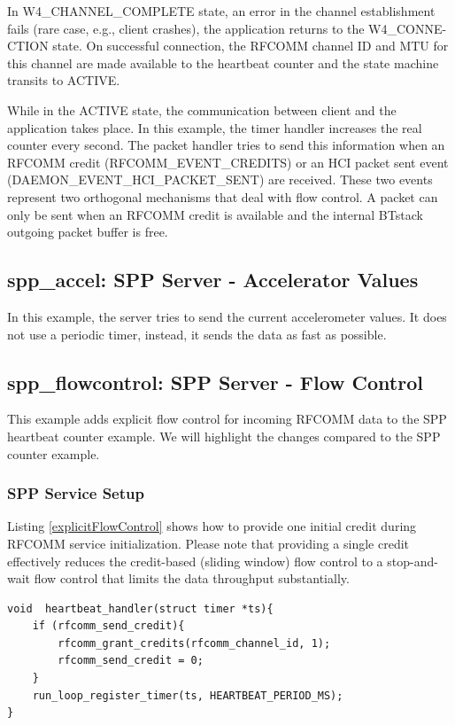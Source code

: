 \documentclass[a4paper,titlepage,oneside,12pt]{amsart} %
\begin{document}
In W4\_CHANNEL\_COMPLETE state, an error in the channel establishment fails (rare case, e.g., client crashes), the application returns to the W4\_CONNE-CTION state. On successful connection, the RFCOMM channel ID and MTU for this channel are made available to the heartbeat counter and the state machine transits to ACTIVE.

While in the ACTIVE state, the communication between client and the application takes place. In this example, the timer handler increases the real counter every second. The packet handler tries to send this information when an RFCOMM credit (RFCOMM\_EVENT\_CREDITS) or an HCI packet sent event (DAEMON\_EVENT\_HCI\_PACKET\_SENT) are received. These two events represent two orthogonal mechanisms that deal with flow control. A packet can only be sent when an RFCOMM credit is available and the internal BTstack outgoing packet buffer is free.


\subsection{spp\_accel: SPP Server - Accelerator Values}
In this example, the server tries to send the current accelerometer values. It does not use a periodic timer, instead, it sends the data as fast as possible. 


\subsection {spp\_flowcontrol: SPP Server - Flow Control}
\label{example:spp_flow_control}
This example adds explicit flow control for incoming RFCOMM data to the SPP heartbeat counter example. We will highlight the changes compared to the SPP counter example. 

\subsubsection{SPP Service Setup}

Listing \ref{explicitFlowControl} shows how to provide one initial credit during RFCOMM service initialization. Please note that providing a single credit effectively reduces the credit-based (sliding window) flow control to a stop-and-wait flow control that limits the data throughput substantially.

\begin{lstlisting}[float, caption= Heartbeat handler with manual credit management. , label=hbhManual]
void  heartbeat_handler(struct timer *ts){
    if (rfcomm_send_credit){
        rfcomm_grant_credits(rfcomm_channel_id, 1);
        rfcomm_send_credit = 0;
    }
    run_loop_register_timer(ts, HEARTBEAT_PERIOD_MS);
}
\end{lstlisting}
\end{document}

